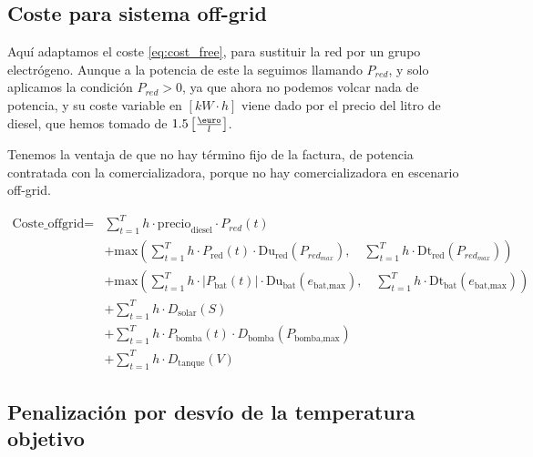 \subsection{Coste para sistema off-grid}

Aquí adaptamos el coste \ref{eq:cost_free}, para sustituir la red por un grupo
electrógeno. Aunque a la potencia de este la seguimos llamando $P_{red}$, y
solo aplicamos la condición $P_{red} > 0$, ya que ahora no podemos volcar nada
de potencia, y su coste variable en $[kW\cdot h]$ viene dado por el precio del
litro de diesel, que hemos tomado de $1.5 \left[\frac{\text{\euro}}{l}\right]$.

Tenemos la ventaja de que no hay término fijo de la factura, de potencia
contratada con la comercializadora, porque no hay comercializadora en escenario
off-grid.

\begin{equation} \label{eq:cost_offgrid}
	\begin{split}
		\text{Coste\_offgrid} = & \sum_{t=1}^{T} h \cdot \text{precio}_\text{diesel} \cdot P_{red}(t)                                                                                                                    \\
		                        & + \text{max} \left( \sum_{t=1}^{T} h \cdot P_\text{red}(t) \cdot \text{Du}_\text{red}(P_{red_{max}}), \quad \sum_{t=1}^{T} h \cdot \text{Dt}_\text{red}(P_{red_{max}}) \right)         \\
		                        & + \text{max} \left( \sum_{t=1}^{T} h \cdot |P_\text{bat}(t)| \cdot \text{Du}_\text{bat}(e_\text{bat,max}), \quad \sum_{t=1}^{T} h \cdot \text{Dt}_\text{bat}(e_\text{bat,max}) \right) \\
		                        & + \sum_{t=1}^{T} h \cdot D_\text{solar}(S)                                                                                                                                             \\
		                        & + \sum_{t=1}^{T} h \cdot P_\text{bomba}(t) \cdot D_\text{bomba}(P_\text{bomba,max})                                                                                                    \\
		                        & + \sum_{t=1}^{T} h \cdot D_\text{tanque}(V)
	\end{split}
\end{equation}


\subsection{Penalización por desvío de la temperatura objetivo}

